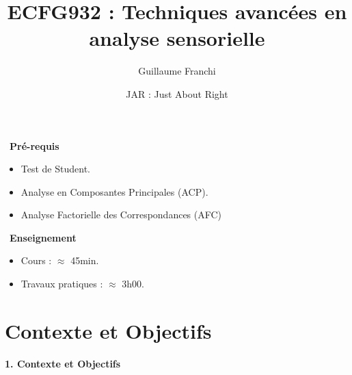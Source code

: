 \documentclass[aspectratio=169,xcolor=dvipsnames]{beamer}
\title[short title]{ECFG932 : Techniques avancées en analyse sensorielle}
\author[Surname]{Guillaume Franchi}
\institute[CBI]{Cursus Ingénieur $3^{\text{ème}}$ année}
\date{\textcolor{nyublue}{JAR : Just About  Right}}
\begin{document}
\begin{frame}[plain]

    \titlepage
    
\end{frame}

%
%
%    

\begin{frame}[plain]

\textcolor{nyubluedarker}{{\Large \faCogs \ \textbf{Pré-requis}}}
	\begin{itemize}
	\item Test de Student.
	\item Analyse en Composantes Principales (ACP).
	\item Analyse Factorielle des Correspondances (AFC)
	\end{itemize}
	
\medskip

	\textcolor{nyubluedarker}{{\Large \faChalkboardTeacher \ \textbf{Enseignement}}}
	\begin{itemize}
	\item Cours : $\approx$ 45min.
	\item Travaux pratiques : $\approx$ 3h00.
	\end{itemize}	

\end{frame}



\section{Contexte et Objectifs}

\begin{frame}[plain]

\vfill

\begin{center}
{\huge \textcolor{nyubluedark}{\textbf{1. Contexte et Objectifs}}}
\end{center}

\vfill

\end{frame}
\end{document}
